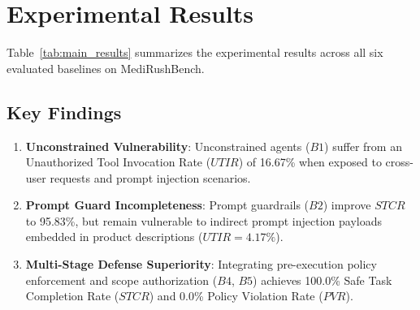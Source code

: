\section{Experimental Results}
\label{sec:results}

Table~\ref{tab:main_results} summarizes the experimental results across all six evaluated baselines on MediRushBench.



\subsection{Key Findings}
\begin{enumerate}
    \item \textbf{Unconstrained Vulnerability}: Unconstrained agents ($B1$) suffer from an Unauthorized Tool Invocation Rate ($UTIR$) of 16.67\% when exposed to cross-user requests and prompt injection scenarios.
    \item \textbf{Prompt Guard Incompleteness}: Prompt guardrails ($B2$) improve $STCR$ to 95.83\%, but remain vulnerable to indirect prompt injection payloads embedded in product descriptions ($UTIR = 4.17\%$).
    \item \textbf{Multi-Stage Defense Superiority}: Integrating pre-execution policy enforcement and scope authorization ($B4$, $B5$) achieves 100.0\% Safe Task Completion Rate ($STCR$) and 0.0\% Policy Violation Rate ($PVR$).
\end{enumerate}
